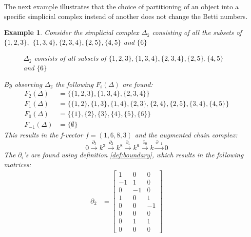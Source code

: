 \documentclass[11pt,a4paper,twoside]{report}
\newtheorem{myex}[mythm]{Example}
\begin{document}
The next example illustrates that the choice of partitioning of an object into a specific simplicial complex instead of another does not change the Betti numbers.
\begin{myex}
Consider the simplicial complex $\Delta_2$ consisting of all the subsets of $\{1,2,3\},$ $\{1,3,4\},\{2,3,4\},\{2,5\},\{4,5\}$ and $\{6\}$
\begin{figure}[H]
\center
{}
\caption{$\Delta_2$ consists of all subsets of $\{1,2,3\},\{1,3,4\},\{2,3,4\},\{2,5\},\{4,5\}$ and $\{6\}$}
\label{fig:ex2}
\end{figure}
By observing $\Delta_2$ the following $F_i(\Delta)$ are found:
\begin{align*}
F_2(\Delta) &= \{\{1,2,3\},\{1,3,4\},\{2,3,4\}\}\\
F_1(\Delta) &= \{\{1,2\},\{1,3\},\{1,4\},\{2,3\},\{2,4\},\{2,5\},\{3,4\},\{4,5\}\}\\
F_0(\Delta) &= \{\{1\},\{2\},\{3\},\{4\},\{5\},\{6\}\}\\
F_{-1}(\Delta) &= \{\emptyset\}
\end{align*}
This results in the f-vector $f=(1,6,8,3)$ and the augmented chain complex:
\begin{equation*}
0\overset{\partial_3}{\to} k^3\overset{\partial_2}{\to} k^8\overset{\partial_1}{\to} k^6\overset{\partial_0}{\to} k \overset{\partial_{-1}}{\to} 0
\end{equation*}
The $\partial_i$'s are found using definition \ref{def:boundary}, which results in the following matrices:
\begin{align*}
\partial_2&=
\begin{bmatrix}
1 & 0 & 0 \\
-1 & 1 & 0 \\
0 & -1 & 0 \\
1 & 0 & 1 \\
0 & 0 & -1 \\
0 & 0 & 0 \\
0 & 1 & 1 \\
0 & 0 & 0 
\end{bmatrix}

\end{align*}
\end{myex}
\end{document}
